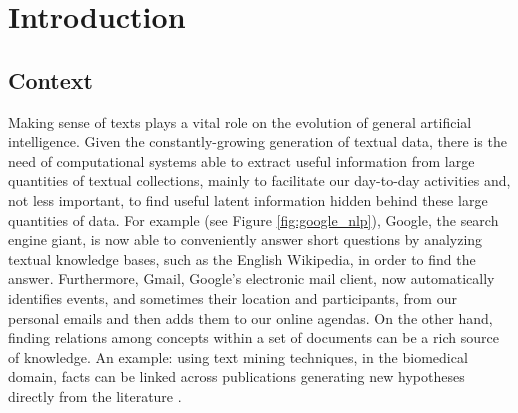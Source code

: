 \chapter{Introduction}
\label{chap:intro}
\minitoc
\section{Context}

Making sense of texts plays a vital role on the evolution of general artificial intelligence. Given the constantly-growing generation of textual data, there is the need of computational systems able to extract useful information from large quantities of textual collections, mainly to facilitate our day-to-day activities and, not less important, to find useful latent information hidden behind these large quantities of data. For example (see Figure \ref{fig:google_nlp}), Google, the search engine giant, is now able to conveniently answer short questions by analyzing textual knowledge bases, such as the English Wikipedia, in order to find the answer. Furthermore, Gmail, Google's electronic mail client, now  automatically identifies events, and sometimes their location and participants, from our personal emails and then adds  them to our online agendas. On the other hand, finding relations among concepts within a set of documents can be a rich source of knowledge. An example: using text mining techniques, in the biomedical domain,  facts can be linked across publications generating new hypotheses directly from the literature \cite{garten2010recent}. 

